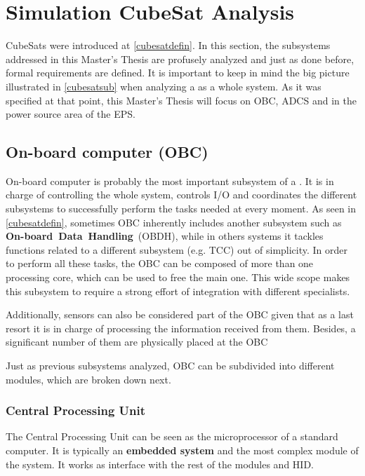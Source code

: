 \section{Simulation CubeSat Analysis} \label{cubesatanaly}

CubeSats were introduced at \autoref{cubesatdefin}. In this section, the subsystems addressed in this Master's Thesis are profusely analyzed and just as done before, formal requirements are defined. It is important to keep in mind the big picture illustrated in \autoref{cubesatsub} when analyzing a  as a whole system. As it was specified at that point, this Master's Thesis will focus on \acrshort{OBC}, \acrshort{ADCS} and in the power source area of the \acrshort{EPS}.

\subsection{On-board computer (OBC)}\label{sec:OBC}

On-board computer is probably the most important subsystem of a . It is in charge of controlling the whole system, controls I/O and coordinates the different subsystems to successfully perform the tasks needed at every moment. As seen in \ref{cubesatdefin}, sometimes \acrshort{OBC} inherently includes another subsystem such as \textbf{On-board~Data~Handling}~(\acrshort{OBDH}), while in others systems it tackles functions related to a different subsystem (e.g. \acrshort{TCC}) out of simplicity. In order to perform all these tasks, the \acrshort{OBC} can be composed of more than one processing core, which can be used to free the main one. This wide scope makes this subsystem to require a strong effort of integration with different specialists.

Additionally, sensors can also be considered part of the \acrshort{OBC} given that as a last resort it is in charge of processing the information received from them. Besides, a significant number of them are physically placed at the \acrshort{OBC}

Just as previous subsystems analyzed, \acrshort{OBC} can be subdivided into different modules, which are broken down next.

\subsubsection{Central Processing Unit}

The Central Processing Unit  can be seen as the microprocessor of a standard computer. It is typically an \textbf{embedded system} and the most complex module of the system. It works as interface with the rest of the modules and \acrshort{HID}.

